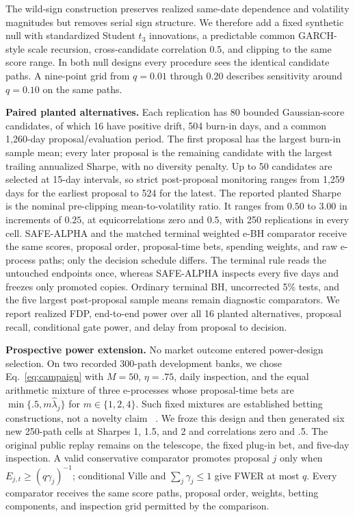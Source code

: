 The wild-sign construction preserves realized same-date dependence and
volatility magnitudes but removes serial sign structure.  We therefore add a
fixed synthetic null with standardized Student \(t_3\) innovations, a
predictable common GARCH-style scale recursion, cross-candidate correlation
\(0.5\), and clipping to the same score range.  In both null designs every
procedure sees the identical candidate paths.  A nine-point grid from
\(q=0.01\) through \(0.20\) describes sensitivity around \(q=0.10\) on the
same paths.

\textbf{Paired planted alternatives.}
Each replication has 80 bounded Gaussian-score candidates, of which 16 have
positive drift, 504 burn-in days, and a common 1,260-day proposal/evaluation
period.  The first proposal has the largest burn-in sample mean; every later
proposal is the remaining candidate with the largest trailing annualized
Sharpe, with no diversity penalty.  Up to 50 candidates are selected at
15-day intervals, so strict post-proposal monitoring ranges from 1,259 days
for the earliest proposal to 524 for the latest.  The reported planted Sharpe
is the nominal pre-clipping mean-to-volatility ratio.  It ranges from
\(0.50\) to \(3.00\) in increments of \(0.25\), at equicorrelations zero and
\(0.5\), with 250 replications in every cell.  SAFE-ALPHA and the matched
terminal weighted e-BH comparator receive the same scores, proposal order,
proposal-time bets, spending weights, and raw e-process paths; only the
decision schedule differs.  The terminal rule reads the untouched endpoints
once, whereas SAFE-ALPHA inspects every five days and freezes only promoted
copies.  Ordinary terminal BH, uncorrected 5\% tests, and the five largest
post-proposal sample means remain diagnostic comparators.  We report realized
FDP, end-to-end power over all 16 planted alternatives, proposal recall,
conditional gate power, and delay from proposal to decision.

\textbf{Prospective power extension.}
No market outcome entered power-design selection.  On two recorded 300-path
development banks, we chose Eq.~\eqref{eq:campaign} with \(M=50\),
\(\eta=.75\), daily inspection, and the equal arithmetic mixture of three
e-processes whose proposal-time bets are
\(\min\{.5,m\widehat\lambda_j\}\) for \(m\in\{1,2,4\}\).  Such fixed mixtures
are established betting constructions, not a novelty claim
~\cite{waudbysmith2024betting,kaufmann2021mixture}.  We froze this design and
then generated six new 250-path cells at Sharpes 1, 1.5, and 2 and correlations
zero and .5.  The original public replay remains on the telescope, the fixed
plug-in bet, and five-day inspection.  A valid conservative comparator promotes
proposal \(j\) only when \(E_{j,t}\ge(q\gamma_j)^{-1}\); conditional Ville and
\(\sum_j\gamma_j\le1\) give FWER at most \(q\).  Every comparator receives the
same score paths, proposal order, weights, betting components, and inspection
grid permitted by the comparison.

